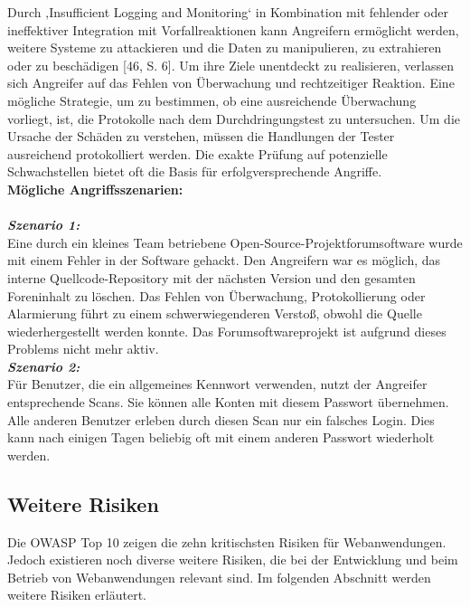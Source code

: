 Durch ‚Insufficient Logging and Monitoring‘ in Kombination mit fehlender oder ineffektiver Integration mit Vorfallreaktionen kann Angreifern ermöglicht werden, weitere Systeme zu attackieren und die Daten zu manipulieren, zu extrahieren oder zu beschädigen [46, S. 6]. Um ihre Ziele unentdeckt zu realisieren, verlassen sich Angreifer auf das Fehlen von Überwachung und rechtzeitiger Reaktion. Eine mögliche Strategie, um zu bestimmen, ob eine ausreichende Überwachung vorliegt, ist, die Protokolle nach dem Durchdringungstest zu untersuchen. Um die Ursache der Schäden zu verstehen, müssen die Handlungen der Tester ausreichend protokolliert werden. Die exakte Prüfung auf potenzielle Schwachstellen bietet oft die Basis für erfolgversprechende Angriffe\cite[16]{owasp17top10}.\\

\textbf{Mögliche Angriffsszenarien:}\\
\\
\textbf{\textit{Szenario 1:}}\\

Eine durch ein kleines Team betriebene Open-Source-Projektforumsoftware wurde mit einem Fehler in der Software gehackt. Den Angreifern war es möglich, das interne Quellcode-Repository mit der nächsten Version und den gesamten Foreninhalt zu löschen. Das Fehlen von Überwachung, Protokollierung oder Alarmierung führt zu einem schwerwiegenderen Verstoß, obwohl die Quelle wiederhergestellt werden konnte. Das Forumsoftwareprojekt ist aufgrund dieses Problems nicht mehr aktiv\cite[16]{owasp17top10}.\\

\textbf{\textit{Szenario 2:}}\\

Für Benutzer, die ein allgemeines Kennwort verwenden, nutzt der Angreifer entsprechende Scans. Sie können alle Konten mit diesem Passwort übernehmen. Alle anderen Benutzer erleben durch diesen Scan nur ein falsches Login. Dies kann nach einigen Tagen beliebig oft mit einem anderen Passwort wiederholt werden\cite[16]{owasp17top10}.\\

\subsection{Weitere Risiken}

Die OWASP Top 10 zeigen die zehn kritischsten Risiken für Webanwendungen. Jedoch existieren noch diverse weitere Risiken, die bei der Entwicklung und beim Betrieb von Webanwendungen relevant sind. Im folgenden Abschnitt werden weitere Risiken erläutert.

